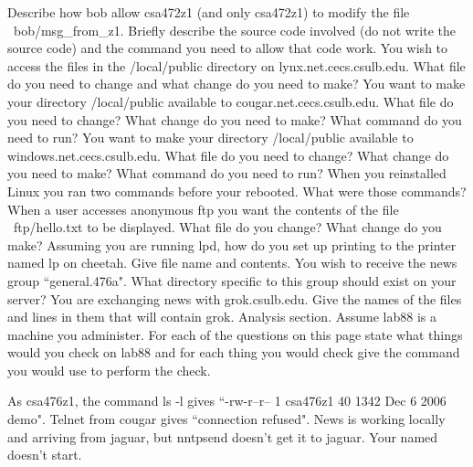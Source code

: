 Describe how {\ltt{}bob} allow {\ltt{}csa472z1} (and only
{\ltt{}csa472z1}) to modify the file {\ltt{}~bob/msg_from_z1}.
Briefly describe the source code involved (do not write the source code)
and the command you need to allow that code work.
\vskip 1.8in
\ques
You wish to access the files in the
{\ltt{}/local/public} directory on {\ltt{}lynx.net.cecs.csulb.edu}.
What file do you need to change and what change do you need to make?
\vskip 0.9in
\ques
You want to make your directory 
{\ltt{}/local/public}
available to
{\ltt{}cougar.net.cecs.csulb.edu}.
What file do you need to change?
What change do you need to make?
What command do you need to run?
\vskip 1.2in
\ques
You want to make your directory 
{\ltt{}/local/public}
available to
{\ltt{}windows.net.cecs.csulb.edu}.
What file do you need to change?
What change do you need to make?
What command do you need to run?
\vskip 1.5in
\vfill\eject
\ques
When you reinstalled Linux you ran two commands
before your rebooted.
What were those commands?
\vskip 0.9in
\ques
When a user accesses anonymous ftp you want the
contents of the file {\ltt{}~ftp/hello.txt}
to be displayed.
What file do you change? What change do you make?
\vskip 1.0in
\ques
Assuming you are running {\ltt{}lpd}, how do you set up printing
to the printer named {\ltt{}lp} on {\ltt{}cheetah.}
Give file name and contents.
\vskip 1.2in
\ques
You wish to receive the news group ``general.476a".
What directory specific to this group should exist on your server?
\vskip 1.0in
\ques
You are exchanging news with {\ltt{}grok.csulb.edu}.
Give the names of the files and lines in them that
will contain {\ltt{}grok}.
\vskip 2.2in
\vfill\eject
Analysis section. Assume {\ltt{}lab88} is a machine you administer.
For each of the questions on this page
state what things would you check on {\ltt{}lab88}
and for each thing you would check give the command you would use to
perform the check.

\ques
As {\ltt{}csa476z1}, the command 
{\ltt{}ls -l} gives
``{\ltt{}-rw-r--r-- 1 csa476z1 40 1342 Dec 6 2006 demo}".
\vfill
\ques
Telnet from {\ltt{}cougar} gives ``connection refused".
\vfill
\ques
News is working locally and arriving from jaguar,
but {\ltt{}nntpsend} doesn't get it to jaguar.
\vfill
\ques
Your {\ltt{}named} doesn't start.
\bye
